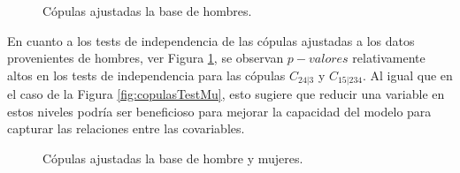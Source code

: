\begin{figure}[H]
 \centering
    \caption{Cópulas ajustadas la base de hombres.}
    \label{fig:copulasTestHo}
\end{figure}
\vspace{-0.3cm}

En cuanto a los tests de independencia de las cópulas ajustadas a los datos provenientes de hombres, ver Figura \ref{fig:copulasTestHo}, se observan $p-valores$ relativamente altos en los tests de independencia para las cópulas $C_{24|3}$ y $C_{15|234}$. Al igual que en el caso de la Figura \ref{fig:copulasTestMu}, esto sugiere que reducir una variable en estos niveles podría ser beneficioso para mejorar la capacidad del modelo para capturar las relaciones entre las covariables. 

\begin{figure}[H]
 \centering
    \caption{Cópulas ajustadas la base de hombre y mujeres.}
    \label{fig:copulasTestTotal}
\end{figure}
\vspace{-0.3cm}

